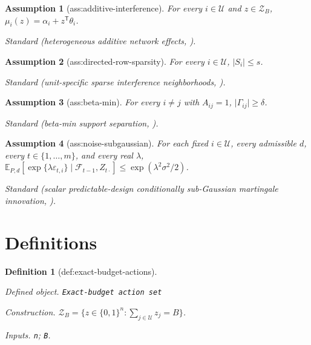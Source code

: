 \documentclass{article}
\newtheorem{assumption}{Assumption}
\newtheorem{definition}{Definition}
\begin{document}
\begin{assumption}[ass:additive-interference]\label{ass:additive-interference}
For every \(i\in\mathcal U\) and \(z\in\mathcal Z_B\), \(\mu_i(z)=\alpha_i+z^{\mathsf T}\theta_i\).
\par\smallskip\noindent\emph{Standard} (heterogeneous additive network effects, \cite{YuAiroldiBorgsChayes2022}).
\end{assumption}

\begin{assumption}[ass:directed-row-sparsity]\label{ass:directed-row-sparsity}
For every \(i\in\mathcal U\), \(\lvert S_i\rvert\le s\).
\par\smallskip\noindent\emph{Standard} (unit-specific sparse interference neighborhoods, \cite{AgarwalAgarwalMasoeroWhitehouse2024}).
\end{assumption}

\begin{assumption}[ass:beta-min]\label{ass:beta-min}
For every \(i\ne j\) with \(A_{ij}=1\), \(\lvert\Gamma_{ij}\rvert\ge\delta\).
\par\smallskip\noindent\emph{Standard} (beta-min support separation, \cite{Wainwright2009}).
\end{assumption}

\begin{assumption}[ass:noise-subgaussian]\label{ass:noise-subgaussian}
For each fixed \(i\in\mathcal U\), every admissible \(d\), every \(t\in\{1,\ldots,m\}\), and every real \(\lambda\), \(\mathbb E_{P,d}[\exp\{\lambda\varepsilon_{t,i}\}\mid\mathcal F_{t-1},Z_{t\cdot}]\le\exp(\lambda^2\sigma^2/2)\).
\par\smallskip\noindent\emph{Standard} (scalar predictable-design conditionally sub-Gaussian martingale innovation, \cite{AbbasiYadkoriPalSzepesvari2011}).
\end{assumption}

\section{Definitions}

\begin{definition}[def:exact-budget-actions]\label{def:exact-budget-actions}
\par\smallskip\noindent\emph{Defined object.} \texttt{Exact-\allowbreak{}budget action set}
\par\smallskip\noindent\emph{Construction.} \(\mathcal Z_B=\{z\in\{0,1\}^n:\sum_{j\in\mathcal U}z_j=B\}\).
\par\smallskip\noindent\emph{Inputs.} \texttt{n}; \texttt{B}.
\end{definition}
\end{document}
